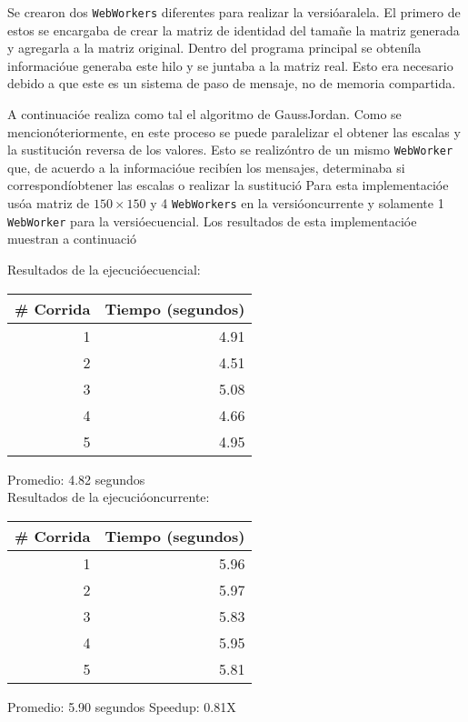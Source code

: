 \documentclass[10pt,letterpaper,oneside]{article}
\begin{document}
{Se crearon dos \verb!WebWorkers! diferentes para realizar la versióaralela. El primero de estos se encargaba de crear la matriz de identidad del tamañe la matriz generada y agregarla a la matriz original. Dentro del programa principal se obteníla informacióue generaba este hilo y se juntaba a la matriz real. Esto era necesario debido a que este es un sistema de paso de mensaje, no de memoria compartida.

A continuacióe realiza como tal el algoritmo de GaussJordan. Como se mencionóteriormente, en este proceso se puede paralelizar el obtener las escalas y la sustitución reversa de los valores. Esto se realizóntro de un mismo \verb!WebWorker! que, de acuerdo a la informacióue recibíen los mensajes, determinaba si correspondíobtener las escalas o realizar la sustitució
Para esta implementacióe usóa matriz de $150\times150$ y 4 \verb!WebWorkers! en la versióoncurrente y solamente 1 \verb!WebWorker! para la versióecuencial. Los resultados de esta implementacióe muestran a continuació
\begin{center}

    Resultados de la ejecucióecuencial:
    
    \begin{tabular}{|r|r|}
    \hline
    \hline
    \# Corrida & Tiempo (segundos)  \\
    \hline
    \hline
    1 & 4.91 \\
    2 & 4.51 \\
    3 & 5.08 \\
    4 & 4.66 \\
    5 & 4.95 \\
    \hline
    \end{tabular}
    
    Promedio: 4.82 segundos\\
    \medskip
    \medskip
    \medskip
    Resultados de la ejecucióoncurrente:
    
    \begin{tabular}{|r|r|}
    \hline
    \hline
    \# Corrida & Tiempo (segundos)  \\
    \hline
    \hline
    1 & 5.96 \\
    2 & 5.97 \\
    3 & 5.83 \\
    4 & 5.95 \\
    5 & 5.81 \\
    \hline
    \end{tabular}
    
    Promedio: 5.90 segundos
    \medskip
    \medskip
    \medskip
    Speedup: 0.81X
    

\end{center}}
\end{document}
